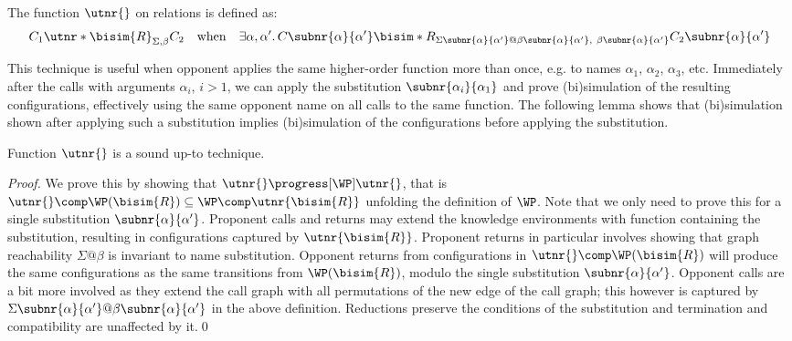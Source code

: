 \begin{definition}
  The function $\utnr{}$ on relations is defined as:
  \begin{gather*}
    C_1 \utnr*{\bisim{R}}_{\Sigma,\beta} C_2
    \quad\text{when}\quad
    \exists\alpha,\alpha'.\,C\subnr{\alpha}{\alpha'} \bisim*{R}_{\Sigma\subnr{\alpha}{\alpha'}@\beta\subnr{\alpha}{\alpha'},~\beta\subnr{\alpha}{\alpha'}} C_2\subnr{\alpha}{\alpha'}
  \end{gather*}
\end{definition}

This technique is useful when opponent applies the same higher-order function more than once, e.g. to names $\alpha_1$, $\alpha_2$, $\alpha_3$, etc. Immediately after the calls with arguments $\alpha_i$, $i > 1$, we can apply the substitution $\subnr{\alpha_i}{\alpha_1}$ and prove (bi)simulation of the resulting configurations, effectively using the same opponent name on all calls to the same function. %
  The following lemma shows that (bi)simulation shown after applying such a substitution implies (bi)simulation of the configurations before applying the substitution.

\begin{lemma}\label{lem:nrsound}%
  Function $\utnr{}$ is a sound up-to technique.
\end{lemma}
\begin{proof}
  We prove this by showing that $\utnr{} \progress[\WP] \utnr{}$, that is $\utnr{}\comp\WP(\bisim{R}) \subseteq \WP\comp \utnr{\bisim{R}}$ unfolding the definition of $\WP$.
  Note that we only need to prove this for a single substitution $\subnr{\alpha}{\alpha'}$.
  Proponent calls and returns may extend the knowledge environments with function containing the substitution, resulting in configurations captured by $\utnr{\bisim{R}}$.
  Proponent returns in particular involves showing that graph reachability $\Sigma@\beta$ is invariant to name substitution.
  Opponent returns from configurations in $\utnr{}\comp\WP(\bisim{R})$ will produce the same configurations as the same transitions from $\WP(\bisim{R})$, modulo the single substitution $\subnr{\alpha}{\alpha'}$.
  Opponent calls are a bit more involved as they extend the call graph with all permutations of the new edge of the call graph; this however is captured by $\Sigma\subnr{\alpha}{\alpha'}@\beta\subnr{\alpha}{\alpha'}$ in the above definition.
  Reductions preserve the conditions of the substitution and termination and compatibility are unaffected by it.\qed
\end{proof}

